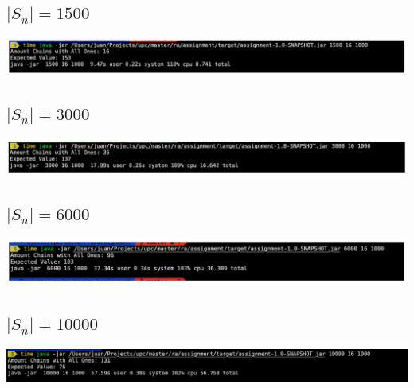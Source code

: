 \documentclass[12pt, a4paper]{article}
\begin{document}
\subsection{$|S_n| = 1500$}

\begin{minipage}[t]{\linewidth}
\includegraphics[width=\textwidth]{experiment2}
\label{fig:experiment2}
\end{minipage}

\subsection{$|S_n| = 3000$}

\begin{minipage}[t]{\linewidth}
\includegraphics[width=\textwidth]{experiment3}
\label{fig:experiment3}
\end{minipage}

\subsection{$|S_n| = 6000$}

\begin{minipage}[t]{\linewidth}
\includegraphics[width=\textwidth]{experiment4}
\label{fig:experiment4}
\end{minipage}

\subsection{$|S_n| = 10000$}

\begin{minipage}[t]{\linewidth}
  \includegraphics[width=\textwidth]{experiment5}
  \label{fig:experiment5}
\end{minipage}
\end{document}
